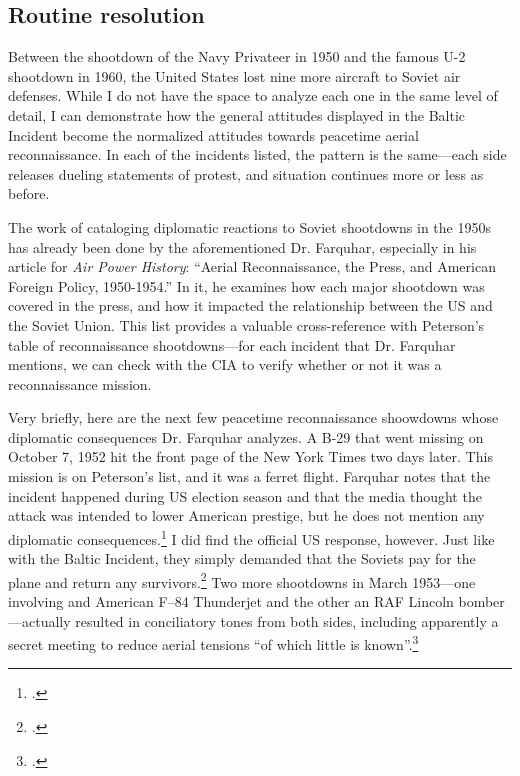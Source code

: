 \documentclass{report}
\begin{document}
\begin{refsegment}
\subsection{Routine resolution}
Between the shootdown of the Navy Privateer in 1950 and the famous U-2 shootdown in 1960, the United States lost nine more aircraft to Soviet air defenses. While I do not have the space to analyze each one in the same level of detail, I can demonstrate how the general attitudes displayed in the Baltic Incident become the normalized attitudes towards peacetime aerial reconnaissance. In each of the incidents listed, the pattern is the same---each side releases dueling statements of protest, and situation continues more or less as before.

The work of cataloging diplomatic reactions to Soviet shootdowns in the 1950s has already been done by the aforementioned Dr. Farquhar, especially in his article for \emph{Air Power History}: ``Aerial Reconnaissance, the Press, and American Foreign Policy, 1950-1954.'' In it, he examines how each major shootdown was covered in the press, and how it impacted the relationship between the US and the Soviet Union. This list provides a valuable cross-reference with Peterson's table of reconnaissance shootdowns---for each incident that Dr. Farquhar mentions, we can check with the CIA to verify whether or not it was a reconnaissance mission.

Very briefly, here are the next few peacetime reconnaissance shoowdowns whose diplomatic consequences Dr. Farquhar analyzes. A B-29 that went missing on October 7, 1952 hit the front page of the New York Times two days later. This mission is on Peterson's list, and it was a ferret flight. Farquhar notes that the incident happened during US election season and that the media thought the attack was intended to lower American prestige, but he does not mention any diplomatic consequences.\footcite[p.~43-44]{farquhar_aerial_2015} I did find the official US response, however. Just like with the Baltic Incident, they simply demanded that the Soviets pay for the plane and return any survivors.\footcite{the_new_york_times_u.s._1952} Two more shootdowns in March 1953---one involving and American F–84 Thunderjet and the other an RAF Lincoln bomber---actually resulted in conciliatory tones from both sides, including apparently a secret meeting to reduce aerial tensions ``of which little is known''.\footcite[p.~45]{farquhar_aerial_2015}


\end{refsegment}
\end{document}
